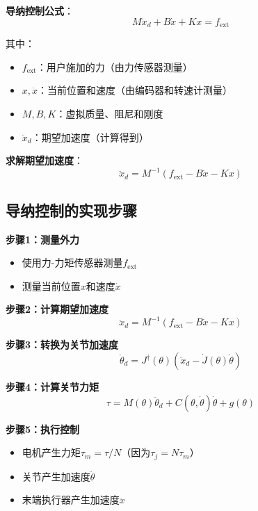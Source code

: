 \documentclass[12pt,a4paper]{article}
\begin{document}
\textbf{导纳控制公式}：
\begin{equation}
M\ddot{x}_d + B\dot{x} + Kx = f_{\text{ext}} \tag{11.64-admittance}
\end{equation}

其中：
\begin{itemize}
\item $f_{\text{ext}}$：用户施加的力（由力传感器测量）
\item $x, \dot{x}$：当前位置和速度（由编码器和转速计测量）
\item $M, B, K$：虚拟质量、阻尼和刚度
\item $\ddot{x}_d$：期望加速度（计算得到）
\end{itemize}

\textbf{求解期望加速度}：
\begin{equation}
\ddot{x}_d = M^{-1}(f_{\text{ext}} - B\dot{x} - Kx) \tag{11.66}
\end{equation}

\subsection{导纳控制的实现步骤}

\textbf{步骤1：测量外力}
\begin{itemize}
\item 使用力-力矩传感器测量$f_{\text{ext}}$
\item 测量当前位置$x$和速度$\dot{x}$
\end{itemize}

\textbf{步骤2：计算期望加速度}
\begin{equation}
\ddot{x}_d = M^{-1}(f_{\text{ext}} - B\dot{x} - Kx)
\end{equation}

\textbf{步骤3：转换为关节加速度}
\begin{equation}
\ddot{\theta}_d = J^{\dagger}(\theta)(\ddot{x}_d - \dot{J}(\theta)\dot{\theta})
\end{equation}

\textbf{步骤4：计算关节力矩}
\begin{equation}
\tau = M(\theta)\ddot{\theta}_d + C(\theta, \dot{\theta})\dot{\theta} + g(\theta)
\end{equation}

\textbf{步骤5：执行控制}
\begin{itemize}
\item 电机产生力矩$\tau_m = \tau/N$（因为$\tau_j = N\tau_m$）
\item 关节产生加速度$\ddot{\theta}$
\item 末端执行器产生加速度$\ddot{x}$
\end{itemize}
\end{document}
